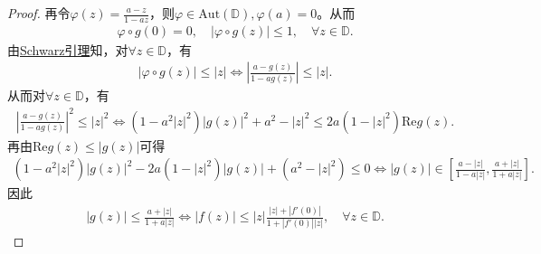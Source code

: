 \documentclass[../../main.tex]{subfiles}%
\begin{document}
\begin{proof}
再令$\varphi(z)=\frac{a-z}{1-az}$，则$\varphi\in\mathrm{Aut}(\mathbb{D}),\varphi(a)=0$。从而
\begin{align*}
\varphi\circ g(0)=0,\quad |\varphi\circ g(z)|\leqslant 1,\quad \forall z\in\mathbb{D}.
\end{align*}
由\hyperref[theorem:Schwarz引理-定理4.5.3]{Schwarz引理}知，对$\forall z\in\mathbb{D}$，有
\begin{align*}
|\varphi\circ g(z)|\leqslant |z|\Longleftrightarrow \left|\frac{a-g(z)}{1-ag(z)}\right|\leqslant |z|.
\end{align*}
从而对$\forall z\in\mathbb{D}$，有
\begin{align*}
\left|\frac{a-g(z)}{1-ag(z)}\right|^2\leqslant |z|^2\Longleftrightarrow (1-a^2|z|^2)|g(z)|^2+a^2-|z|^2\leqslant 2a(1-|z|^2)\mathrm{Re}g(z).
\end{align*}
再由$\mathrm{Re}g(z)\leqslant |g(z)|$可得
\begin{align*}
(1-a^2|z|^2)|g(z)|^2-2a(1-|z|^2)|g(z)|+(a^2-|z|^2)\leqslant 0\Longleftrightarrow |g(z)|\in\left[\frac{a-|z|}{1-a|z|},\frac{a+|z|}{1+a|z|}\right].
\end{align*}
因此
\begin{align*}
|g(z)|\leqslant \frac{a+|z|}{1+a|z|}\Longleftrightarrow |f(z)|\leqslant |z|\frac{|z|+|f'(0)|}{1+|f'(0)||z|},\quad \forall z\in\mathbb{D}.
\end{align*}
\end{proof}
\end{document}
